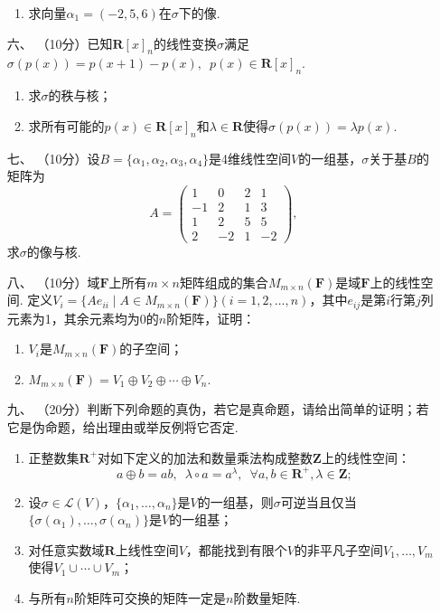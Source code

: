 \begin{enumerate}
\begin{enumerate}[label=(\arabic*)]
        \item 求向量$\alpha_1=(-2,5,6)$在$\sigma$下的像.
    \end{enumerate}
	\item[六、] （10分）已知$\mathbf{R}[x]_n$的线性变换$\sigma$满足$\sigma(p(x))=p(x+1)-p(x),\enspace p(x)\in\mathbf{R}[x]_n$.
	\begin{enumerate}[label=(\arabic*)]
        \item 求$\sigma$的秩与核；

        \item 求所有可能的$p(x)\in\mathbf{R}[x]_n$和$\lambda\in\mathbf{R}$使得$\sigma(p(x))=\lambda p(x)$.
    \end{enumerate}
	\item[七、]（10分）设$B=\{\alpha_1,\alpha_2,\alpha_3,\alpha_4\}$是4维线性空间$V$的一组基，$\sigma$关于基$B$的矩阵为
    \[A=\begin{pmatrix}1 & 0 & 2 & 1 \\ -1 & 2 & 1 & 3 \\ 1 & 2 & 5 & 5 \\ 2 & -2 & 1 & -2\end{pmatrix},\]
    求$\sigma$的像与核.

    \item[八、]（10分）域$\mathbf{F}$上所有$m\times n$矩阵组成的集合$M_{m\times n}(\mathbf{F})$是域$\mathbf{F}$上的线性空间. 定义$V_i=\{Ae_{ii}\mid A\in M_{m\times n}(\mathbf{F})\}(i=1,2,\ldots,n)$，其中$e_{ij}$是第$i$行第$j$列元素为1，其余元素均为0的$n$阶矩阵，证明：
    \begin{enumerate}[label=(\arabic*)]
        \item $V_i$是$M_{m\times n}(\mathbf{F})$的子空间；

        \item $M_{m\times n}(\mathbf{F})=V_1\oplus V_2\oplus\cdots\oplus V_n$.
    \end{enumerate}
	\item[九、]（20分）判断下列命题的真伪，若它是真命题，请给出简单的证明；若它是伪命题，给出理由或举反例将它否定.
    \begin{enumerate}[label=(\arabic*)]
        \item 正整数集$\mathbf{R}^+$对如下定义的加法和数量乘法构成整数$\mathbf{Z}$上的线性空间：
        \[a\oplus b=ab,\enspace\lambda\circ a=a^\lambda,\enspace\forall a,b\in\mathbf{R}^+,\lambda\in\mathbf{Z};\]

        \item 设$\sigma\in\mathcal{L}(V)$，$\{\alpha_1,\ldots,\alpha_n\}$是$V$的一组基，则$\sigma$可逆当且仅当$\{\sigma(\alpha_1),\ldots,\sigma(\alpha_n)\}$是$V$的一组基；

        \item 对任意实数域$\mathbf{R}$上线性空间$V$，都能找到有限个$V$的非平凡子空间$V_1,\ldots,V_m$使得$V_1\cup\cdots\cup V_m$；

        \item 与所有$n$阶矩阵可交换的矩阵一定是$n$阶数量矩阵.
    \end{enumerate}
\end{enumerate}

\clearpage
